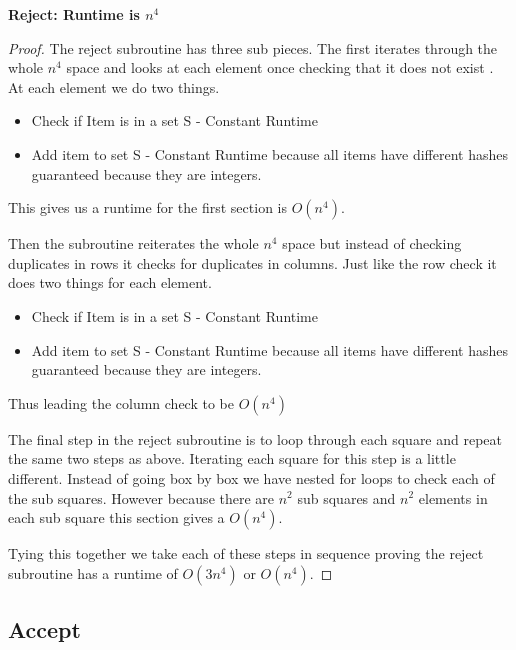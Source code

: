\documentclass{sig-alternate}
\begin{document}
\textbf{Reject: Runtime is $n^4$}
\begin{proof}
The reject subroutine has three sub pieces. The first iterates through the whole $n^4$ space and looks at each element once checking that it does not exist . At each element we do two things.
\begin{itemize}
\item{Check if Item is in a set S - Constant Runtime}
\item{Add item to set S - Constant Runtime because all items have different hashes guaranteed because they are integers.}
\end{itemize}

This gives us a runtime for the first section is $O(n^4)$.

Then the subroutine reiterates the whole $n^4$ space but instead of checking duplicates in rows it checks for duplicates in columns. Just like the row check it does two things for each element. 
\begin{itemize}
\item{Check if Item is in a set S - Constant Runtime}
\item{Add item to set S - Constant Runtime because all items have different hashes guaranteed because they are integers.}
\end{itemize}
Thus leading the column check to be $O(n^4)$

The final step in the reject subroutine is to loop through each square and repeat the same two steps as above. Iterating each square for this step is a little different. Instead of going box by box we have nested for loops to check each of the sub squares. However because there are $n^2$ sub squares and $n^2$ elements in each sub square this section gives a $O(n^4)$.

Tying this together we take each of these steps in sequence proving the reject subroutine has a runtime of $O(3n^4)$ or $O(n^4)$.
\end{proof}

\subsection{Accept}
\end{document}
